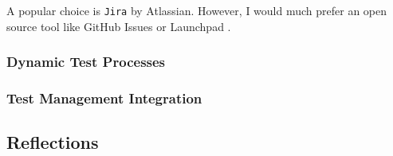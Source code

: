 A popular choice is \texttt{Jira}\cite{tools:jira} by Atlassian. However, I would much
prefer an open source tool like GitHub Issues\cite{tools:github-issues} or
Launchpad \cite{tools:launchpad}.

\subsubsection{Dynamic Test Processes}

\subsubsection{Test Management Integration}

\subsection{Reflections}\label{task-1c-reflect}


